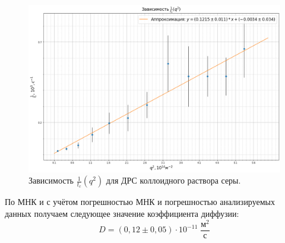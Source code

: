 \documentclass{article}
\begin{document}
\begin{figure}[h!]
\centering
    \includegraphics[width=0.8\linewidth]{Images/Сера.png}
    \caption{Зависимость $\frac{1}{t_c}(q^2)$ для ДРС коллоидного раствора серы.}
    \label{fig: Настоящая сера 1}
\end{figure}

\par По МНК и с учётом погрешностью МНК и погрешностью анализируемых данных получаем следующее значение коэффициента диффузии:
$$D = (0,12 \pm 0,05) \cdot 10^{-11} \; \frac{\text{м}^2}{\text{с}}$$
\end{document}
